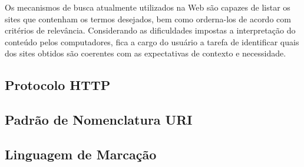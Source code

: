 
Os mecanismos de busca atualmente utilizados na Web são capazes de listar os sites que contenham os termos desejados, bem como orderna-los de acordo com critérios de relevância. Considerando as dificuldades impostas a interpretação do conteúdo pelos computadores, fica a cargo do usuário a tarefa de identificar quais dos sites obtidos são coerentes com as expectativas de contexto e necessidade.


\subsection{Protocolo HTTP} %
\label{sub:protocolo_http}




\subsection{Padrão de Nomenclatura URI} %
\label{sub:padrão_de_nomenclatura_uri}


\subsection{Linguagem de Marcação} %
\label{sub:linguagem_de_marcação}



